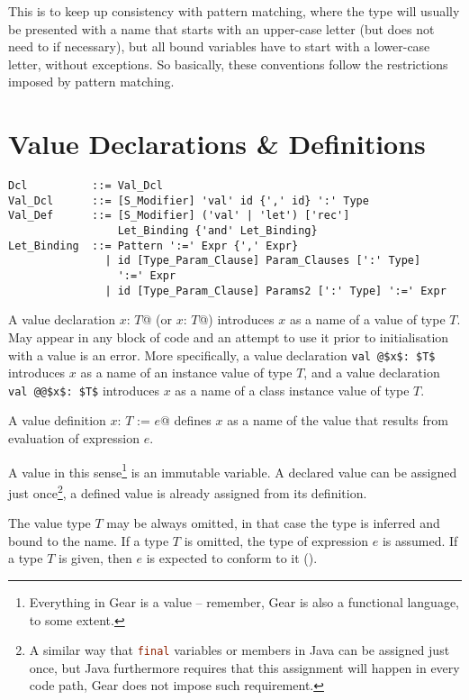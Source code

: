 This is to keep up consistency with pattern matching, where the type will usually be presented with a name that starts with an upper-case letter (but does not need to if necessary), but all bound variables have to start with a lower-case letter, without exceptions. So basically, these conventions follow the restrictions imposed by pattern matching. 





\section{Value Declarations \& Definitions}
\label{sec:value-dcl-def}

\syntax\begin{lstlisting}
Dcl          ::= Val_Dcl
Val_Dcl      ::= [S_Modifier] 'val' id {',' id} ':' Type
Val_Def      ::= [S_Modifier] ('val' | 'let') ['rec']
                 Let_Binding {'and' Let_Binding}
Let_Binding  ::= Pattern ':=' Expr {',' Expr}
               | id [Type_Param_Clause] Param_Clauses [':' Type]
                 ':=' Expr
               | id [Type_Param_Clause] Params2 [':' Type] ':=' Expr
\end{lstlisting}

A value declaration \lstinline@val $x$: $T$@ (or \lstinline@let $x$: $T$@) introduces $x$ as a name of a value of type $T$. May appear in any block of code and an attempt to use it prior to initialisation with a value is an error. More specifically, a value declaration \lstinline+val @$x$: $T$+ introduces $x$ as a name of an instance value of type $T$, and a value declaration \lstinline+val @@$x$: $T$+ introduces $x$ as a name of a class instance value of type $T$. 

A value definition \lstinline@val $x$: $T$ := $e$@ defines $x$ as a name of the value that results from evaluation of expression $e$.

A value in this sense\footnote{Everything in Gear is a value -- remember, Gear is also a functional language, to some extent.} is an immutable variable. A declared value can be assigned just once\footnote{A similar way that \lstinline[language=Java]@final@ variables or members in Java can be assigned just once, but Java furthermore requires that this assignment will happen in every code path, Gear does not impose such requirement.}, a defined value is already assigned from its definition. 

The value type $T$ may be always omitted, in that case the type is inferred and bound to the name. If a type $T$ is omitted, the type of expression $e$ is assumed. If a type $T$ is given, then $e$ is expected to conform to it (). 

